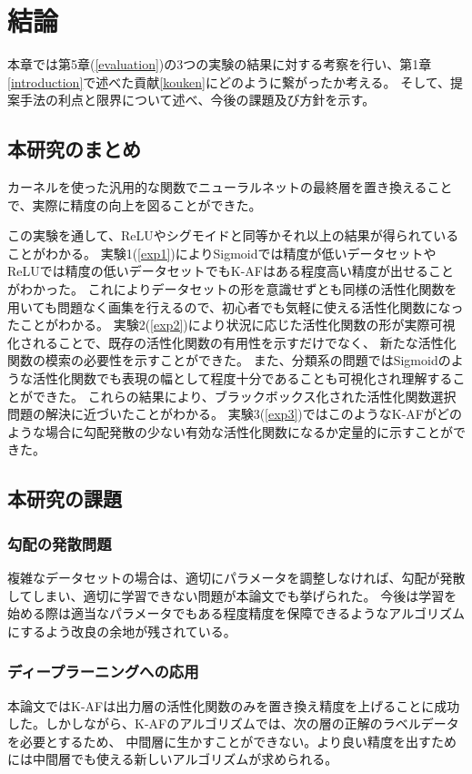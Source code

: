\chapter{結論}
\label{conclusion}

本章では第5章(\ref{evaluation})の3つの実験の結果に対する考察を行い、第1章\ref{introduction}で述べた貢献\ref{kouken}にどのように繋がったか考える。
そして、提案手法の利点と限界について述べ、今後の課題及び方針を示す。


\section{本研究のまとめ}

カーネルを使った汎用的な関数でニューラルネットの最終層を置き換えることで、実際に精度の向上を図ることができた。

この実験を通して、ReLUやシグモイドと同等かそれ以上の結果が得られていることがわかる。
 実験1(\ref{exp1})によりSigmoidでは精度が低いデータセットやReLUでは精度の低いデータセットでもK-AFはある程度高い精度が出せることがわかった。
これによりデータセットの形を意識せずとも同様の活性化関数を用いても問題なく画集を行えるので、初心者でも気軽に使える活性化関数になったことがわかる。
 実験2(\ref{exp2})により状況に応じた活性化関数の形が実際可視化されることで、既存の活性化関数の有用性を示すだけでなく、
 新たな活性化関数の模索の必要性を示すことができた。
 また、分類系の問題ではSigmoidのような活性化関数でも表現の幅として程度十分であることも可視化され理解することができた。
これらの結果により、ブラックボックス化された活性化関数選択問題の解決に近づいたことがわかる。
 実験3(\ref{exp3})ではこのようなK-AFがどのような場合に勾配発散の少ない有効な活性化関数になるか定量的に示すことができた。



\section{本研究の課題}

\subsection{勾配の発散問題}
複雑なデータセットの場合は、適切にパラメータを調整しなければ、勾配が発散してしまい、適切に学習できない問題が本論文でも挙げられた。
今後は学習を始める際は適当なパラメータでもある程度精度を保障できるようなアルゴリズムにするよう改良の余地が残されている。

\subsection{ディープラーニングへの応用}
本論文ではK-AFは出力層の活性化関数のみを置き換え精度を上げることに成功した。しかしながら、K-AFのアルゴリズムでは、次の層の正解のラベルデータを必要とするため、
中間層に生かすことができない。より良い精度を出すためには中間層でも使える新しいアルゴリズムが求められる。



